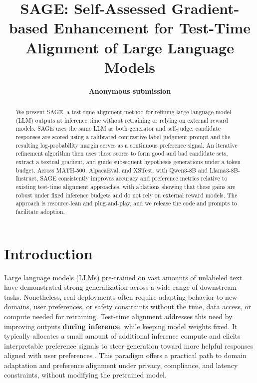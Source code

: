 \documentclass[11pt]{article}
\title{SAGE: Self-Assessed Gradient-based Enhancement for Test-Time Alignment of Large Language Models}
\author{
  \textbf{Anonymous submission}
}
\theoremstyle{plain}
\theoremstyle{definition}
\theoremstyle{remark}
\newcommand{\method}{SAGE}
\begin{document}
\maketitle

\begin{abstract}
We present \method{}, a test-time alignment method for refining large language model (LLM) outputs at inference time without retraining or relying on external reward models. \method{} uses the same LLM as both generator and self-judge: candidate responses are scored using a calibrated contrastive label judgment prompt and the resulting log-probability margin serves as a continuous preference signal. An iterative refinement algorithm then uses these scores to form good and bad candidate sets, extract a textual gradient, and guide subsequent hypothesis generations under a token budget. 
Across MATH-500, AlpacaEval, and XSTest, with Qwen3-8B and Llama3-8B-Instruct, \method{} consistently improves accuracy and preference metrics relative to existing test-time alignment approaches, with ablations showing that these gains are robust under fixed inference budgets and do not rely on external reward models. The approach is resource-lean and plug-and-play, and we release the code and prompts to facilitate adoption.
\end{abstract}

\section{Introduction}


Large language models (LLMs) pre-trained on vast amounts of unlabeled text have demonstrated strong generalization across a wide range of downstream tasks. Nonetheless, real deployments often require adapting behavior to new domains, user preferences, or safety constraints without the time, data access, or compute needed for retraining. Test-time alignment addresses this need by improving outputs \textbf{during inference}, while keeping model weights fixed. It typically allocates a small amount of additional inference compute and elicits interpretable preference signals to steer generation toward more helpful responses aligned with user preferences \cite{litest}. This paradigm offers a practical path to domain adaptation and preference alignment under privacy, compliance, and latency constraints, without modifying the pretrained model.
\end{document}
